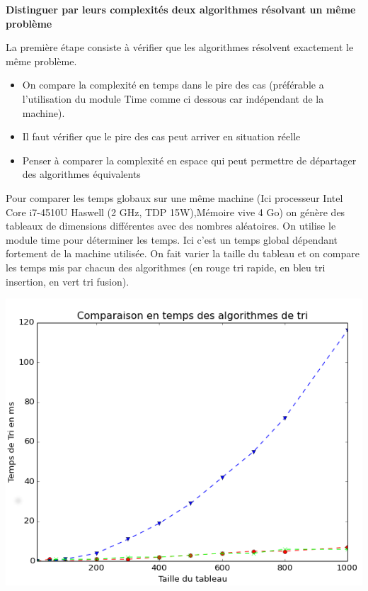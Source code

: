 
\begin{prop}

\small{\textbf{\textsf{Distinguer par leurs complexités deux algorithmes résolvant
un même problème}}}

La première étape consiste à vérifier que les algorithmes résolvent exactement le même problème.

\begin{itemize}
\item On compare la complexité en temps dans le pire des cas (préférable a l'utilisation du module Time comme ci dessous car indépendant de la machine).
\item Il faut vérifier que le pire des cas peut arriver en situation réelle
\item Penser à comparer la complexité en espace qui peut permettre de départager des algorithmes équivalents
\end{itemize}
\end{prop}

\begin{exemple2}

Pour comparer les temps globaux sur une même machine (Ici processeur Intel Core i7-4510U Haswell (2 GHz, TDP 15W),Mémoire vive 4 Go) on génère des tableaux de dimensions différentes avec des nombres aléatoires.
On utilise le module time pour déterminer les temps. Ici c'est un temps global dépendant fortement de la machine utilisée.
On fait varier la taille du tableau et on compare les temps mis par chacun des algorithmes (en rouge tri rapide, en bleu tri insertion, en vert tri fusion). 

\begin{center}
\includegraphics[width=.7\textwidth]{images/Fin.png}
\end{center}

\end{exemple2}




